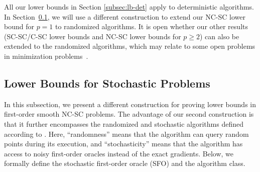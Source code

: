 \documentclass{article}
\begin{document}


All our lower bounds in Section \ref{subsec:lb-det} apply to deterministic algorithms.
In Section~\ref{subsec:lb-stoc}, we will use a different construction to extend our NC-SC lower bound for $p=1$ to randomized algorithms.
It is open whether our other results (SC-SC/C-SC lower bounds and NC-SC lower bounds for $p \ge 2$) can also be extended to the randomized algorithms, which may relate to some open problems in minimization problems~\citep[Section 6.2]{carmon2021lower}.



\subsection{Lower Bounds for Stochastic Problems} \label{subsec:lb-stoc}

In this subsection, we present a different construction for proving lower bounds in first-order smooth NC-SC problems. The advantage of our second construction is that it further encompasses the randomized and stochastic algorithms defined according to \citep{arjevani2023lower}. Here, ``randomness'' means that the algorithm can query random points during its execution, and ``stochasticity'' means that the algorithm has access to noisy first-order oracles instead of the exact gradients. Below, we formally define the stochastic first-order oracle (SFO) and the algorithm class.
\end{document}
